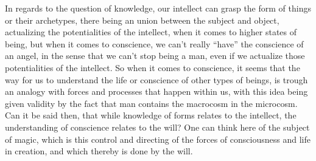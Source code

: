 \begin{footnotesize}
\begin{sffamily}
In regards to the question of knowledge, our intellect can grasp the form of things or their archetypes, there being an union between the subject and object, actualizing the potentialities of the intellect, when it comes to higher states of being, but when it comes to conscience, we can't really ``have'' the conscience of an angel, in the sense that we can't stop being a man, even if we actualize those potentialities of the intellect. So when it comes to conscience, it seems that the way for us to understand the life or conscience of other types of beings, is trough an analogy with forces and processes that happen within us, with this idea being given validity by the fact that man contains the macrocosm in the microcosm. Can it be said then, that while knowledge of forms relates to the intellect, the understanding of conscience relates to the will? One can think here of the subject of magic, which is this control and directing of the forces of consciousness and life in creation, and which thereby is done by the will.

\end{sffamily}
\end{footnotesize}


